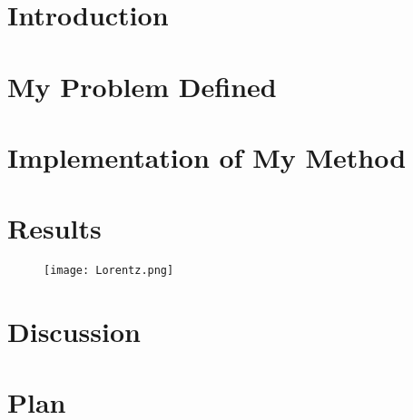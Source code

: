 \documentclass[]{article}
\title{}
\author{}
\begin{document}
\maketitle

\begin{abstract}

\end{abstract}

\section{Introduction}



\section{My Problem Defined}

\section{Implementation of My Method}

\section{Results}
\begin{figure}[H]
	\texttt{[image: Lorentz.png]}
\end{figure}
\section{Discussion}

\section{Plan}
\end{document}
